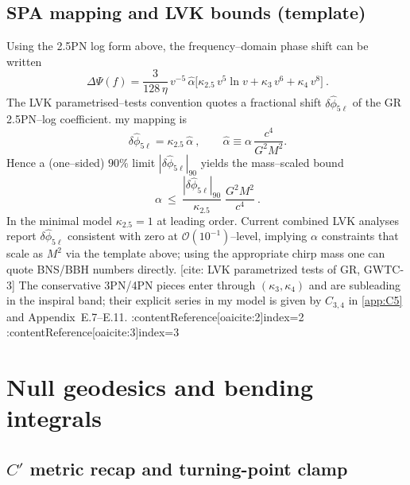 \documentclass{iopjournal}
\begin{document}
\subsection{SPA mapping and LVK bounds (template)}\label{app:C6}
Using the 2.5PN log form above, the frequency–domain phase shift can be written
\[
\boxed{\ \Delta\Psi(f)=\frac{3}{128\,\eta}\,v^{-5}\,\widehat\alpha\Big[\kappa_{2.5}\,v^{5}\ln v+\kappa_{3}\,v^{6}+\kappa_{4}\,v^{8}\Big]\ } .
\]
The LVK parametrised–tests convention quotes a fractional shift $\delta\hat\phi_{5\ell}$ of the GR 2.5PN–log coefficient. my mapping is
\[
\boxed{\ \delta\hat\phi_{5\ell}=\kappa_{2.5}\,\widehat\alpha\ } ,
\qquad \widehat\alpha\equiv \alpha\,\frac{c^{4}}{G^{2}M^{2}}.
\]
Hence a (one–sided) $90\%$ limit $|\delta\hat\phi_{5\ell}|_{\!90}$ yields the mass–scaled bound
\[
\boxed{\ \alpha\ \le\ \frac{|\delta\hat\phi_{5\ell}|_{\!90}}{\kappa_{2.5}}\;\frac{G^{2}M^{2}}{c^{4}}\ } .
\]
In the minimal model $\kappa_{2.5}=1$ at leading order. Current combined LVK analyses report $\delta\hat\phi_{5\ell}$ consistent with zero at $\mathcal O(10^{-1})$–level, implying $\alpha$ constraints that scale as $M^{2}$ via the template above; using the appropriate chirp mass one can quote BNS/BBH numbers directly. [cite: LVK parametrized tests of GR, GWTC-3]  The conservative 3PN/4PN pieces enter through $(\kappa_{3},\kappa_{4})$ and are subleading in the inspiral band; their explicit series in my model is given by $C_{3,4}$ in \cref{app:C5} and Appendix~E.7–E.11. :contentReference[oaicite:2]{index=2} :contentReference[oaicite:3]{index=3}




\section{Null geodesics and bending integrals}\label{app:D}

\subsection{\texorpdfstring{$C'$ metric recap and turning-point clamp}{C' metric recap and turning-point clamp}}
\label{app:D1}
\end{document}
